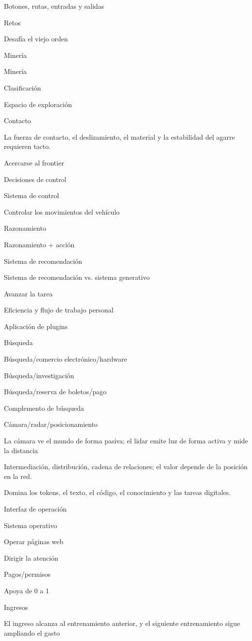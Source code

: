 \documentclass{article}
\begin{document}
Botones, rutas, entradas y salidas

Retos

Desafía el viejo orden

Minería

Minería

Clasificación

Espacio de exploración

Contacto

La fuerza de contacto, el deslizamiento, el material y la estabilidad del agarre requieren tacto.

Acercarse al frontier

Decisiones de control

Sistema de control

Controlar los movimientos del vehículo

Razonamiento

Razonamiento + acción

Sistema de recomendación

Sistema de recomendación vs. sistema generativo

Avanzar la tarea

Eficiencia y flujo de trabajo personal

Aplicación de plugins

Búsqueda

Búsqueda/comercio electrónico/hardware

Búsqueda/investigación

Búsqueda/reserva de boletos/pago

Complemento de búsqueda

Cámara/radar/posicionamiento

La cámara ve el mundo de forma pasiva; el lidar emite luz de forma activa y mide la distancia

Intermediación, distribución, cadena de relaciones; el valor depende de la posición en la red.

Domina los tokens, el texto, el código, el conocimiento y las tareas digitales.

Interfaz de operación

Sistema operativo

Operar páginas web

Dirigir la atención

Pagos/permisos

Apoya de 0 a 1

Ingresos

El ingreso alcanza al entrenamiento anterior, y el siguiente entrenamiento sigue ampliando el gasto
\end{document}
